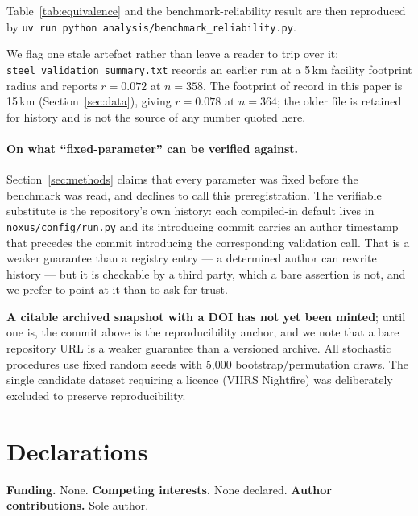 \documentclass[11pt,a4paper]{article}
\newcommand{\rval}[1]{\mbox{$r=#1$}}
\begin{document}
\smallskip
\begin{sloppypar}
\noindent Table~\ref{tab:equivalence} and the benchmark-reliability result are then reproduced by
\texttt{uv run python analysis/\allowbreak benchmark\_reliability.py}.
\end{sloppypar}

We flag one stale artefact rather than leave a reader to trip over it:
\texttt{steel\_validation\_\allowbreak summary.txt} records an earlier run at a 5\,km
facility
footprint radius and reports \rval{0.072} at $n=358$. The footprint of record in this paper is
15\,km (Section~\ref{sec:data}), giving \rval{0.078} at $n=364$; the older file is retained for
history and is not the source of any number quoted here.

\paragraph{On what ``fixed-parameter'' can be verified against.} Section~\ref{sec:methods} claims
that every parameter was fixed before the benchmark was read, and declines to call this
preregistration. The verifiable substitute is the repository's own history: each compiled-in
default lives in \texttt{noxus/config/run.py} and its introducing commit carries an author
timestamp that precedes the commit introducing the corresponding validation call. That is a
weaker guarantee than a registry entry --- a determined author can rewrite history --- but it is
checkable by a third party, which a bare assertion is not, and we prefer to point at it than to
ask for trust.

\textbf{A citable archived snapshot with a DOI has not yet been minted}; until one is, the commit
above is the reproducibility anchor, and we note that a bare repository URL is a weaker guarantee
than a versioned archive. All stochastic procedures use fixed random seeds with 5{,}000
bootstrap/permutation draws. The single candidate dataset requiring a licence (VIIRS Nightfire)
was deliberately excluded to preserve reproducibility.

\section*{Declarations}
\textbf{Funding.} None. \quad \textbf{Competing interests.} None declared. \quad
\textbf{Author contributions.} Sole author.
\end{document}
